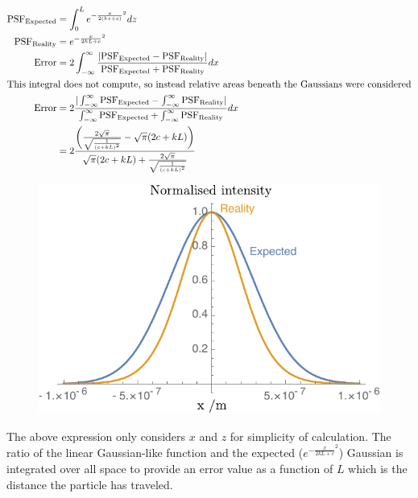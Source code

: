 \begin{align}
  \text{PSF}_{\text{Expected}} &= \int_{0}^{L} e^{-\frac{x}{2(kz+c)}^2} dz \\
  \text{PSF}_{\text{Reality}} &= e^{-\frac{x}{2kL+c}^2} \\
  \text{Error} &= 2 \int_{-\infty}^{\infty} \frac{ |\text{PSF}_{\text{Expected}} - \text{PSF}_{\text{Reality}}|}{\text{PSF}_{\text{Expected}} + \text{PSF}_{\text{Reality}}} dx \\
  \intertext{This integral does not compute, so instead relative areas beneath the Gaussians were considered}
  \text{Error} &= 2 \frac{|\int_{-\infty}^{\infty} \text{PSF}_{\text{Expected}} - \int_{-\infty}^{\infty} \text{PSF}_{\text{Reality}}|}{\int_{-\infty}^{\infty} \text{PSF}_{\text{Expected}} + \int_{-\infty}^{\infty} \text{PSF}_{\text{Reality}}} dx \\
  & = 2 \frac{\left(\frac{2 \sqrt{\pi }}{\sqrt{\frac{1}{(c+k L)^2}}}-\sqrt{\pi } (2 c+k L)\right)}{\sqrt{\pi } (2 c+k L)+\frac{2 \sqrt{\pi }}{\sqrt{\frac{1}{(c+k L)^2}}}}
\end{align}

\begin{figure}
  \centering
  \includegraphics{./mathematica/Guassian_astig_half_both}
  \caption{}
  \label{}
\end{figure}

The above expression only considers $x$ and $z$ for simplicity of calculation.
The ratio of the linear Gaussian-like function and the expected ($e^{-\frac{x}{2kL+c}^2}$) Gaussian is integrated over all space to provide an error value as a function of $L$ which is the distance the particle has traveled.


